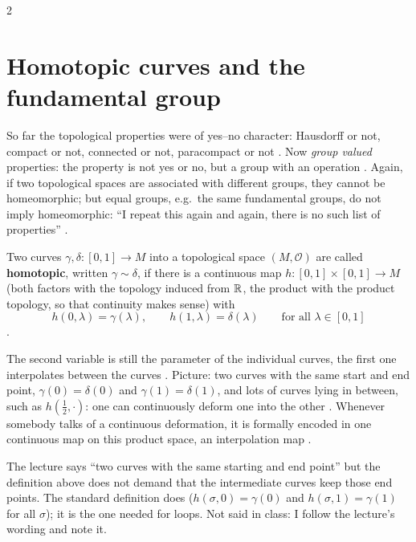 \begin{paracol}{2}
\section{Homotopic curves and the fundamental group}\label{sec:iv-pi1}

So far the topological properties were of yes--no character: Hausdorff or not, compact or not, connected or not, paracompact or not . Now \emph{group valued} properties: the property is not yes or no, but
a group with an operation . Again, if two topological spaces are associated with different groups, they cannot be homeomorphic; but equal groups, e.g.\ the same fundamental groups, do not imply
homeomorphic: ``I repeat this again and again, there is no such list of properties'' .

\begin{definition}\label{def:iv-homotopic}
Two curves $\gamma,\delta\colon[0,1]\to M$ into a topological space $(M,\mathcal O)$ are called \textbf{homotopic}, written $\gamma\sim\delta$, if there is a continuous map $h\colon[0,1]\times[0,1]\to M$ (both
factors with the topology induced from $\mathbb{R}$, the product with the product topology, so that continuity makes sense) with
\[
  h(0,\lambda)=\gamma(\lambda),\qquad h(1,\lambda)=\delta(\lambda)\qquad\text{for all }\lambda\in[0,1]
\]
.
\end{definition}
The second variable is still the parameter of the individual curves, the first one interpolates between the curves . Picture: two curves with the same start and end point,
$\gamma(0)=\delta(0)$ and $\gamma(1)=\delta(1)$, and lots of curves lying in between, such as $h(\tfrac12,\cdot)$: one can continuously deform one into the other .
Whenever somebody talks of a continuous deformation, it is formally encoded in one continuous map on this product space, an interpolation map .
\begin{coursenote}
The lecture says ``two curves with the same starting and end point'' but the definition above does not demand that the intermediate curves keep those end points. The standard definition does ($h(\sigma,0)=\gamma(0)$
and $h(\sigma,1)=\gamma(1)$ for all $\sigma$); it is the one needed for loops. Not said in class: I follow the lecture's wording and note it.
\end{coursenote}


\end{paracol}
